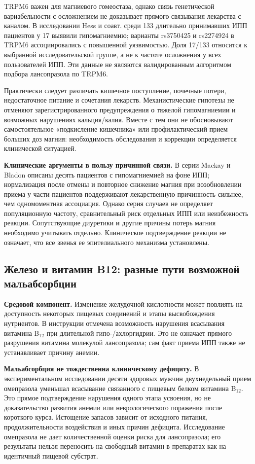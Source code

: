 \documentclass[11pt,a4paper,notitlepage]{report}
\newcommand{\src}[1]{\unskip\space\cite{#1}}
\begin{document}
TRPM6 важен для магниевого гомеостаза, однако связь генетической вариабельности с осложнением не доказывает прямого связывания лекарства с каналом. В исследовании Hess и соавт. среди 133 длительно принимавших ИПП пациентов у 17 выявили гипомагниемию; варианты rs3750425 и rs2274924 в TRPM6 ассоциировались с повышенной уязвимостью. Доля 17/133 относится к выбранной исследовательской группе, а не к частоте осложнения у всех пользователей ИПП. Эти данные не являются валидированным алгоритмом подбора лансопразола по TRPM6.\src{safemggen}

Практически следует различать кишечное поступление, почечные потери, недостаточное питание и сочетания лекарств. Механистические гипотезы не отменяют зарегистрированного предупреждения о тяжелой гипомагниемии и возможных нарушениях кальция/калия. Вместе с тем они не обосновывают самостоятельное «подкисление кишечника» или профилактический прием больших доз магния: необходимость обследования и коррекции определяется клинической ситуацией.\src{uslabel,safemgclaudin}

\textbf{Клинические аргументы в пользу причинной связи.} В серии Mackay и Bladon описаны десять пациентов с гипомагниемией на фоне ИПП; нормализация после отмены и повторное снижение магния при возобновлении приема у части пациентов поддерживают лекарственную причинность сильнее, чем одномоментная ассоциация. Однако серия случаев не определяет популяционную частоту, сравнительный риск отдельных ИПП или неизбежность реакции. Сопутствующие диуретики и другие причины потерь магния необходимо учитывать отдельно. Клиническое подтверждение реакции не означает, что все звенья ее эпителиального механизма установлены.\src{safemgseries2010}

\subsection{Железо и витамин B12: разные пути возможной мальабсорбции}
\textbf{Средовой компонент.} Изменение желудочной кислотности может повлиять на доступность некоторых пищевых соединений и этапы высвобождения нутриентов. В инструкции отмечена возможность нарушения всасывания витамина B$_{12}$ при длительной гипо-/ахлоргидрии. Это не означает прямого разрушения витамина молекулой лансопразола; сам факт приема ИПП также не устанавливает причину анемии.\src{uslabel}

\textbf{Мальабсорбция не тождественна клиническому дефициту.} В экспериментальном исследовании десяти здоровых мужчин двухнедельный прием омепразола уменьшал всасывание связанного с пищевым белком витамина B$_{12}$. Это прямое подтверждение нарушения одного этапа усвоения, но не доказательство развития анемии или неврологического поражения после короткого курса. Истощение запасов зависит от исходного питания, продолжительности воздействия и иных причин дефицита. Исследование омепразола не дает количественной оценки риска для лансопразола; его результаты нельзя переносить на свободный витамин в препаратах как на идентичный пищевой субстрат.\src{safeb12trial1994}
\end{document}
